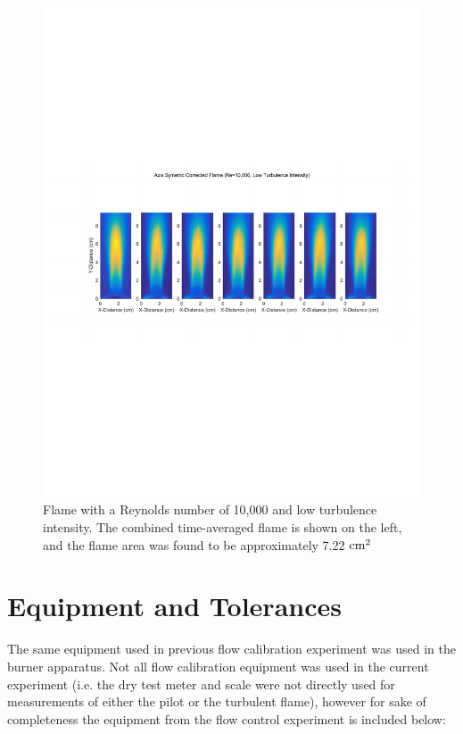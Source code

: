 \documentclass[12pt]{ussci} %
\begin{document}
\begin{appendices}
\begin{figure}[ht]
\centering
\includegraphics[width=.95\textwidth]{Re10kLow.pdf}
\caption{Flame with a Reynolds number of 10,000 and low turbulence intensity.  The combined time-averaged flame is shown on the left, and the flame area was found to be approximately 7.22 $\textnormal{cm}^2$}
\label{fig:10low}
\end{figure}

\clearpage


\section{Equipment and Tolerances}\label{app:Equip}

The same equipment used in previous flow calibration experiment was used in the burner apparatus.  Not all flow calibration equipment was used in the current experiment (i.e. the dry test meter and scale were not directly used for measurements of either the pilot or the turbulent flame), however for sake of completeness the equipment from the flow control experiment is included below:


\end{appendices}
\end{document}
